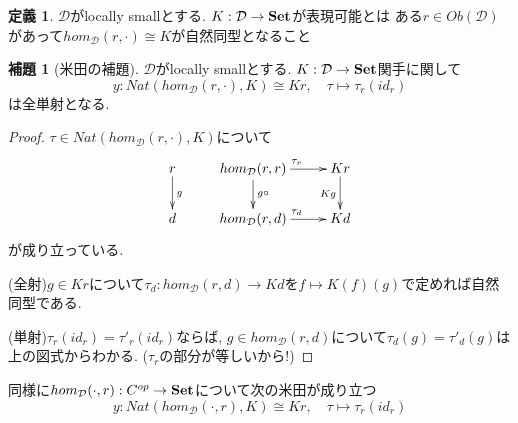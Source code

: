\documentclass[dvipdfmx,a4paper,11pt]{article}
\theoremstyle{definition}
\newtheorem{lem}[thm]{補題}
\newtheorem{dfn}[thm]{定義}
\begin{document}
 \begin{tcolorbox}
 [colback = white, colframe = green!35!black, fonttitle = \bfseries,breakable = true]
\begin{dfn}
$\mathcal{D} $がlocally smallとする. 
$K : \mathcal{D} \to {\bf Set}$が表現可能とは
ある$r \in Ob(\mathcal{D})$があって$hom_{\mathcal{D}}(r, \cdot) \cong K$が自然同型となること
\end{dfn}
\end{tcolorbox}


 \begin{tcolorbox}
 [colback = white, colframe = green!35!black, fonttitle = \bfseries,breakable = true]
\begin{lem}[米田の補題]
$\mathcal{D} $がlocally smallとする. 
$K : \mathcal{D} \to {\bf Set}$関手に関して
$$
y : Nat(hom_{\mathcal{D}}(r, \cdot), K) \cong Kr, \quad  \tau \mapsto\tau_{r}(id_{r})
$$
は全単射となる. 
\end{lem}
\end{tcolorbox}

\begin{proof}
$\tau \in Nat(hom_{\mathcal{D}}(r, \cdot), K) $について
\begin{equation*}
\xymatrix@C=25pt@R=20pt{
r\ar@{->}[d]^{g}&
hom_{\mathcal{D}}(r,r) \ar@{->}[d]^{g \circ}  \ar@{->}[r]^{\tau_r}
 &Kr\ar@{->}[d]_{Kg}\\
 d &
hom_{\mathcal{D}}(r,d) \ar@{->}[r]^{\tau_d}
& Kd\\   
}
\end{equation*}
が成り立っている. 

(全射)$g \in Kr$について$\tau_d : hom_{\mathcal{D}}(r,d) \to  Kd$を$f \mapsto K(f) (g)$で定めれば自然同型である.

(単射)$\tau_{r}(id_{r}) = \tau'_{r}(id_{r})$ならば, $g \in hom_{\mathcal{D}}(r,d)$について$\tau_d(g)=\tau'_{d}(g)$は上の図式からわかる. ($\tau_r$の部分が等しいから!)

\end{proof}

同様に$hom_{\mathcal{D}}(\cdot, r) : C^{op} \to {\bf Set}$について次の米田が成り立つ
$$
y : Nat(hom_{\mathcal{D}}(\cdot, r), K) \cong Kr, \quad  \tau \mapsto\tau_{r}(id_{r})
$$
\end{document}
